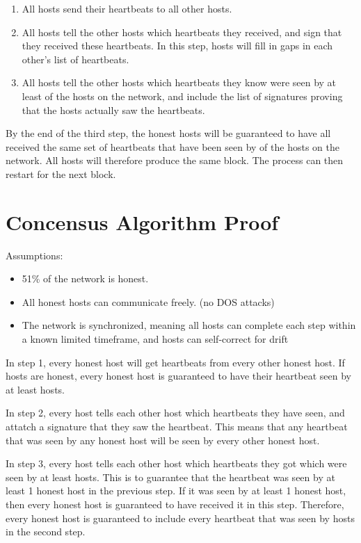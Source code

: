 \documentclass[twocolumn]{article}
\begin{document}
\begin{enumerate}
	\item All hosts send their heartbeats to all other hosts.
	\item All hosts tell the other hosts which heartbeats they received, and sign that they received these heartbeats.
	In this step, hosts will fill in gaps in each other's list of heartbeats.
	\item All hosts tell the other hosts which heartbeats they know were seen by at least \fiftyone \space of the hosts on the network, and include the list of signatures proving that the hosts actually saw the heartbeats.
\end{enumerate}

By the end of the third step, the honest hosts will be guaranteed to have all received the same set of heartbeats that have been seen by \fiftyone \space of the hosts on the network.
All hosts will therefore produce the same block.
The process can then restart for the next block.

\section{Concensus Algorithm Proof}

Assumptions:
\begin{itemize}
	\item 51\% of the network is honest.
	\item All honest hosts can communicate freely. (no DOS attacks)
	\item The network is synchronized, meaning all hosts can complete each step within a known limited timeframe, and hosts can self-correct for drift
\end{itemize}

In step 1, every honest host will get heartbeats from every other honest host.
If \fiftyone hosts are honest, every honest host is guaranteed to have their heartbeat seen by at least \fiftyone hosts.

In step 2, every host tells each other host which heartbeats they have seen, and attatch a signature that they saw the heartbeat.
This means that any heartbeat that was seen by any honest host will be seen by every other honest host.

In step 3, every host tells each other host which heartbeats they got which were seen by at least \fiftyone hosts.
This is to guarantee that the heartbeat was seen by at least 1 honest host in the previous step.
If it was seen by at least 1 honest host, then every honest host is guaranteed to have received it in this step.
Therefore, every honest host is guaranteed to include every heartbeat that was seen by \fiftyone hosts in the second step.
\end{document}
